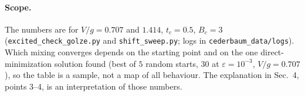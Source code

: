 \documentclass[11pt]{article}
\begin{document}
\paragraph{Scope.} The numbers are for $V/g=0.707$ and $1.414$, $t_c=0.5$, $B_c=3$ (\texttt{excited\_check\_golze.py} and \texttt{shift\_sweep.py}; logs in \texttt{cederbaum\_data/logs}). Which mixing converges depends on the starting point and on the one direct-minimization solution found
(best of $5$ random starts, $30$ at $\varepsilon=10^{-3}$, $V/g=0.707$), so the table is a sample, not a map of all behaviour. The explanation in Sec.~4, points 3--4, is an interpretation of
those numbers.
\end{document}
